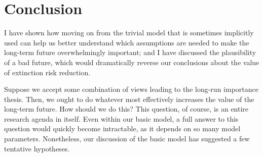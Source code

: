 \documentclass[british]{article}
\begin{document}
\section{Conclusion}\label{conclusion}
I have shown how moving on from the trivial model that is sometimes implicitly used can help us better understand which assumptions are needed to make the long-term future overwhelmingly important; and I have discussed the plausibility of a bad future, which would dramatically reverse our conclusions about the value of extinction risk reduction.

Suppose we accept some combination of views leading to the long-run importance thesis. Then, we ought to do whatever most effectively increases the value of the long-term future. How should we do this? This question, of course, is an entire research agenda in itself. Even within our basic model, a full answer to this question would quickly become intractable, as it depends on so many model parameters. Nonetheless, our discussion of the basic model has suggested a few tentative hypotheses.
\pagebreak
\tableofcontents

\end{document}
